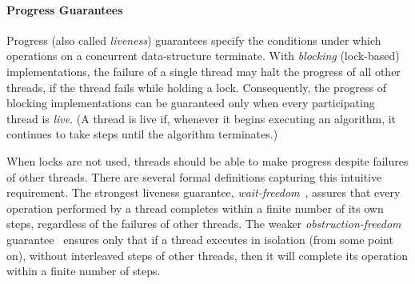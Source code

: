 \paragraph{Progress Guarantees}
Progress (also called \emph{liveness}) guarantees specify the conditions under which operations on a concurrent data-structure terminate. With \emph{blocking} (lock-based) implementations, the failure of a single thread may halt the progress of all other threads, if the thread fails while holding a lock. Consequently, the progress of blocking implementations can be guaranteed only when every participating thread is \emph{live}. (A thread is live if, whenever it begins executing an algorithm, it continues to take steps until the algorithm terminates.)

When locks are not used, threads should be able to make progress despite failures of other threads.
There are several formal definitions capturing this intuitive requirement.
The strongest liveness guarantee, \emph{wait-freedom}~\cite{herlihy91waitfree},
assures that every operation performed by a thread completes within
a finite number of its own steps, regardless of the failures of other threads.
%
The weaker \emph{obstruction-freedom} guarantee~\cite{AttiyaGHK09,HerlihyLMS03, DBLP:conf/icdcs/HerlihyLM03}
ensures only that if a thread executes in isolation (from some point on),
without interleaved steps of other threads,
then it will complete its operation within a finite number of steps.


